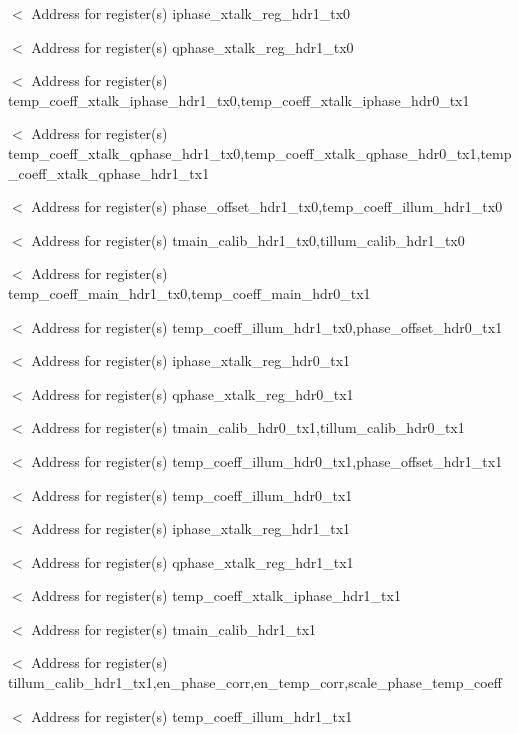 $<$ Address for register(s) iphase\+\_\+xtalk\+\_\+reg\+\_\+hdr1\+\_\+tx0

$<$ Address for register(s) qphase\+\_\+xtalk\+\_\+reg\+\_\+hdr1\+\_\+tx0

$<$ Address for register(s) temp\+\_\+coeff\+\_\+xtalk\+\_\+iphase\+\_\+hdr1\+\_\+tx0,temp\+\_\+coeff\+\_\+xtalk\+\_\+iphase\+\_\+hdr0\+\_\+tx1

$<$ Address for register(s) temp\+\_\+coeff\+\_\+xtalk\+\_\+qphase\+\_\+hdr1\+\_\+tx0,temp\+\_\+coeff\+\_\+xtalk\+\_\+qphase\+\_\+hdr0\+\_\+tx1,temp\+\_\+coeff\+\_\+xtalk\+\_\+qphase\+\_\+hdr1\+\_\+tx1

$<$ Address for register(s) phase\+\_\+offset\+\_\+hdr1\+\_\+tx0,temp\+\_\+coeff\+\_\+illum\+\_\+hdr1\+\_\+tx0

$<$ Address for register(s) tmain\+\_\+calib\+\_\+hdr1\+\_\+tx0,tillum\+\_\+calib\+\_\+hdr1\+\_\+tx0

$<$ Address for register(s) temp\+\_\+coeff\+\_\+main\+\_\+hdr1\+\_\+tx0,temp\+\_\+coeff\+\_\+main\+\_\+hdr0\+\_\+tx1

$<$ Address for register(s) temp\+\_\+coeff\+\_\+illum\+\_\+hdr1\+\_\+tx0,phase\+\_\+offset\+\_\+hdr0\+\_\+tx1

$<$ Address for register(s) iphase\+\_\+xtalk\+\_\+reg\+\_\+hdr0\+\_\+tx1

$<$ Address for register(s) qphase\+\_\+xtalk\+\_\+reg\+\_\+hdr0\+\_\+tx1

$<$ Address for register(s) tmain\+\_\+calib\+\_\+hdr0\+\_\+tx1,tillum\+\_\+calib\+\_\+hdr0\+\_\+tx1

$<$ Address for register(s) temp\+\_\+coeff\+\_\+illum\+\_\+hdr0\+\_\+tx1,phase\+\_\+offset\+\_\+hdr1\+\_\+tx1

$<$ Address for register(s) temp\+\_\+coeff\+\_\+illum\+\_\+hdr0\+\_\+tx1

$<$ Address for register(s) iphase\+\_\+xtalk\+\_\+reg\+\_\+hdr1\+\_\+tx1

$<$ Address for register(s) qphase\+\_\+xtalk\+\_\+reg\+\_\+hdr1\+\_\+tx1

$<$ Address for register(s) temp\+\_\+coeff\+\_\+xtalk\+\_\+iphase\+\_\+hdr1\+\_\+tx1

$<$ Address for register(s) tmain\+\_\+calib\+\_\+hdr1\+\_\+tx1

$<$ Address for register(s) tillum\+\_\+calib\+\_\+hdr1\+\_\+tx1,en\+\_\+phase\+\_\+corr,en\+\_\+temp\+\_\+corr,scale\+\_\+phase\+\_\+temp\+\_\+coeff

$<$ Address for register(s) temp\+\_\+coeff\+\_\+illum\+\_\+hdr1\+\_\+tx1

